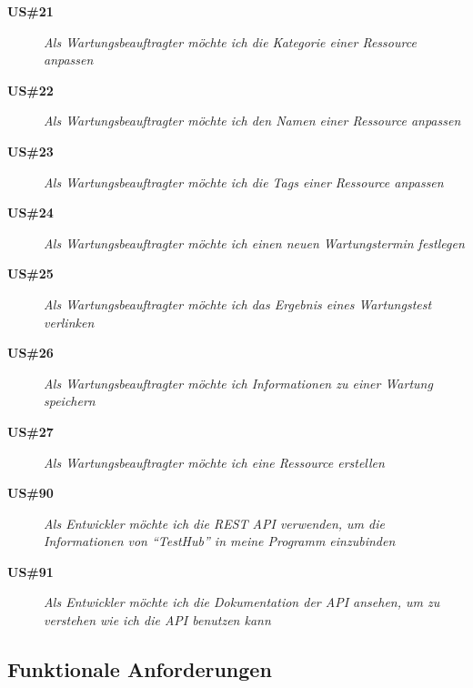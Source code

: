 \begin{description}
    \item[\textbf{US\#21}]\textit{Als Wartungsbeauftragter möchte ich die Kategorie 
    einer Ressource anpassen}

    \item[\textbf{US\#22}]\textit{Als Wartungsbeauftragter möchte ich den Namen 
    einer Ressource anpassen}

    \item[\textbf{US\#23}]\textit{Als Wartungsbeauftragter möchte ich die Tags 
    einer Ressource anpassen}

    \item[\textbf{US\#24}]\textit{Als Wartungsbeauftragter möchte ich einen neuen 
    Wartungstermin festlegen}

    \item[\textbf{US\#25}]\textit{Als Wartungsbeauftragter möchte ich das Ergebnis eines
    Wartungstest verlinken}

    \item[\textbf{US\#26}]\textit{Als Wartungsbeauftragter möchte ich Informationen
    zu einer Wartung speichern}

    \item[\textbf{US\#27}]\textit{Als Wartungsbeauftragter möchte ich eine Ressource erstellen}

    \item[\textbf{US\#90}]\textit{Als Entwickler möchte ich die REST API verwenden, um die
    Informationen von ``TestHub'' in meine Programm einzubinden}

    \item[\textbf{US\#91}]\textit{Als Entwickler möchte ich die Dokumentation
    der API ansehen, um zu verstehen wie ich die API benutzen kann}

\end{description}

\subsection{Funktionale Anforderungen}